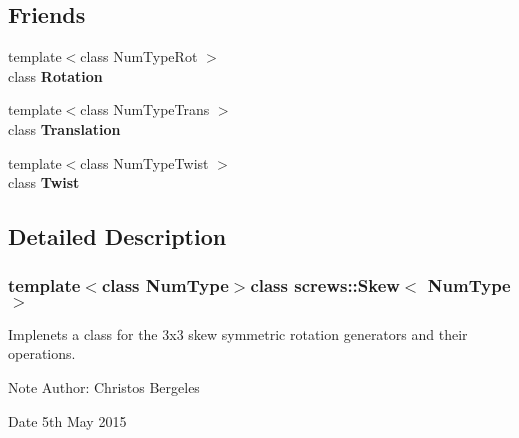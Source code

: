 \subsection*{Friends}
\begin{DoxyCompactItemize}
\item 
\hypertarget{singletonscrews_1_1_skew_a71cdfb2347f288c41e58374b57613143}{{\footnotesize template$<$class Num\+Type\+Rot $>$ }\\class {\bfseries Rotation}}\label{singletonscrews_1_1_skew_a71cdfb2347f288c41e58374b57613143}

\item 
\hypertarget{singletonscrews_1_1_skew_a01e1886aafbf1483da899aba3b6c58da}{{\footnotesize template$<$class Num\+Type\+Trans $>$ }\\class {\bfseries Translation}}\label{singletonscrews_1_1_skew_a01e1886aafbf1483da899aba3b6c58da}

\item 
\hypertarget{singletonscrews_1_1_skew_a90f9fa90695f35a9b08d0e888ea4297e}{{\footnotesize template$<$class Num\+Type\+Twist $>$ }\\class {\bfseries Twist}}\label{singletonscrews_1_1_skew_a90f9fa90695f35a9b08d0e888ea4297e}

\end{DoxyCompactItemize}


\subsection{Detailed Description}
\subsubsection*{template$<$class Num\+Type$>$class screws\+::\+Skew$<$ Num\+Type $>$}

Implenets a class for the 3x3 skew symmetric rotation generators and their operations. 

\begin{DoxyNote}{Note}
Author\+: Christos Bergeles 
\end{DoxyNote}
\begin{DoxyDate}{Date}
5th May 2015 
\end{DoxyDate}


